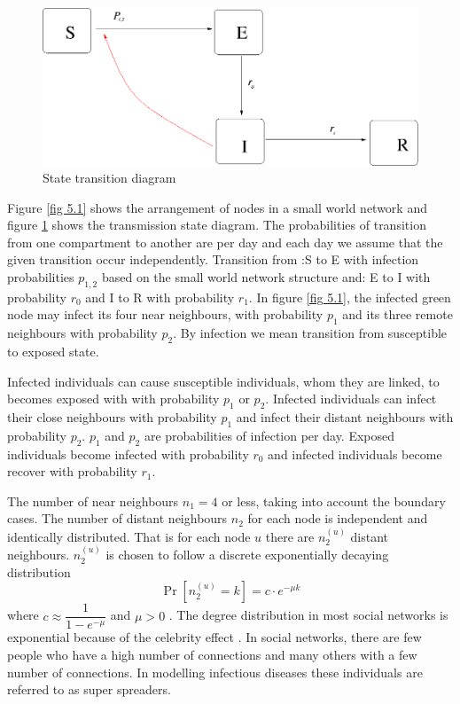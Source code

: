  \begin{figure}[h]
 \centering
 \includegraphics[scale=0.5]{images/swseir.png}
 \caption{State transition diagram} \label{fig 5.2}
\end{figure}

 
Figure \ref{fig 5.1} shows the arrangement of nodes in a small world network and figure \ref{fig 5.2} shows the transmission state diagram. The probabilities of transition from one compartment to another are per day and each day we assume that the given transition occur independently. Transition from :S to E  with infection probabilities $p_ {1,2} $ based on the small world network structure and: E to I with probability $r_0$ and I to R with probability $r_1$. In figure \ref{fig 5.1}, the infected green node may infect its four near neighbours, with probability $p_1$ and its three remote neighbours with probability $p_2$. By infection we mean transition from susceptible to exposed state. 

Infected individuals can cause susceptible individuals, whom they are linked,
to becomes exposed with with probability $p_1$ or $p_2$. Infected individuals can  infect their close neighbours with  probability $p_1$ and infect their distant neighbours with probability $p_2$. $p_1 $ and $p_2$ are probabilities of infection per day. Exposed individuals become infected with probability $r_0$ and infected individuals become recover with probability $r_1$.

The number of near neighbours $n_1 = 4$ or less, taking into account the boundary cases.
The number of distant neighbours $n_2$  for each node is independent and  identically distributed. That is for each node $u$ there are $n_2^ {(u)} $ distant neighbours. $n_2^ {(u)} $ is chosen to follow a discrete exponentially decaying distribution 
\begin{equation} 
 \Pr[n_2^{(u)} = k] = c \cdot e^{-\mu k  } \label{5.2.1}
 \end{equation}
 where $c \approx \dfrac{1}{1- e^{-\mu }}$ and $\mu >0$ \citep{fu2013propagation}.
 The degree distribution in most social networks is exponential because of the celebrity effect \citep{estrada2015first}. In social networks, there are few people who have a high number of connections and many others with a few number of connections. In modelling infectious diseases these individuals are referred to as super spreaders.

